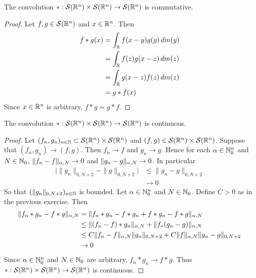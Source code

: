 \documentclass{book}
\begin{document}
	\begin{ex}
		The convolution $*: \mathcal{S}(\mathbb{R}^n) \times \mathcal{S}(\mathbb{R}^n) \rightarrow \mathcal{S}(\mathbb{R}^n)$ is commutative.
	\end{ex}
	
	\begin{proof}
		Let $f,g \in \mathcal{S}(\mathbb{R}^n)$ and $x \in \mathbb{R}^n$. Then 
		\begin{align*}
			f*g(x)
			& = \int_{\mathbb{R}} f(x-y)g(y) \, d m(y) \\
			& = \int_{\mathbb{R}} f(z)g(x-z) \, d m(z) \\
			& = \int_{\mathbb{R}} g(x-z)f(z) \, d m(z) \\
			& = g*f(x) 
		\end{align*}
		Since $x \in \mathbb{R}^n$ is arbitrary, $f*g = g*f$.
	\end{proof}

	\begin{ex}
		The convolution $*: \mathcal{S}(\mathbb{R}^n) \times \mathcal{S}(\mathbb{R}^n) \rightarrow \mathcal{S}(\mathbb{R}^n)$ is continuous.
	\end{ex}

	\begin{proof}
		Let $(f_n,g_n)_{n \in \mathbb{N}} \subset \mathcal{S}(\mathbb{R}^n) \times \mathcal{S}(\mathbb{R}^n)$ and $(f,g) \in \mathcal{S}(\mathbb{R}^n) \times \mathcal{S}(\mathbb{R}^n)$. Suppose that $(f_n, g_n) \rightarrow (f,g)$. Then $f_n \rightarrow f$ and $g_n \rightarrow g$. Hence for each $\alpha \in \mathbb{N}_0^n$ and $N \in \mathbb{N}_0$, $\|f_n - f\|_{\alpha, N} \rightarrow 0$ and $\|g_n - g\|_{\alpha, N} \rightarrow 0$. In particular 
		\begin{align*}
			\bigg|\|g_n\|_{0,N+2} - \|g\|_{0, N+2} \bigg| 
			& \leq \|g_n - g\|_{0, N+2}  \\
			& \rightarrow 0
		\end{align*}
		So that $(\|g_n\|_{0,N+2})_{n \in \mathbb{N}}$ is bounded.
		Let $\alpha \in \mathbb{N}_0^n$ and $N \in \mathbb{N}_0$. Define $C >0$ as in the previous exercise. Then 
		\begin{align*}
			\|f_n *g_n - f*g\|_{\alpha,N} 
			& = \|f_n *g_n - f*g_n + f*g_n - f*g\|_{\alpha,N} \\ 
			& \leq \|(f_n -f )*g_n\|_{\alpha,N} + \|f_ *(g_n -g)\|_{\alpha,N} \\
			& \leq C\|f_n -f\|_{\alpha,N}\|g_n\|_{0, N+2} + C\|f\|_{\alpha,N}\|g_n-g\|_{0, N+2} \\
			& \rightarrow 0
		\end{align*}
		Since $\alpha \in \mathbb{N}_0^n$ and $N \in \mathbb{N}_0$ are arbitrary, $f_n *g_n \rightarrow f*g$. Thus $*:\mathcal{S}(\mathbb{R}^n) \times \mathcal{S}(\mathbb{R}^n) \rightarrow \mathcal{S}(\mathbb{R}^n)$ is continuous.
	\end{proof}
\end{document}
